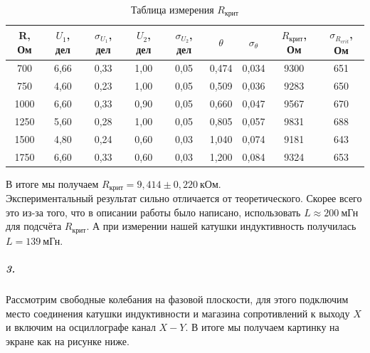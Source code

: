 \documentclass[a4paper,12pt]{article}
\begin{document}
\begin{table}[h!]
\begin{center}
\begin{tabular}{|c|c|c|c|c|c|c|c|c|}
\hline
R, Ом & $U_1$, дел & $\sigma_{U_1}$, дел & $U_2$, дел & $\sigma_{U_2}$, дел & $\theta$ & $\sigma_{\theta}$ & $R_{крит}$, Ом & $\sigma_{R_{crit}}$, Ом \\ \hline
700  & 6,66          & 0,33                 & 1,00        & 0,05                 & 0,474     & 0,034              & 9300          & 651                    \\ \hline
750  & 4,60          & 0,23                 & 1,00        & 0,05                 & 0,509     & 0,036              & 9283          & 650                    \\ \hline
1000  & 6,60          & 0,33                 & 0,90        & 0,05                 & 0,660     & 0,047              & 9567          & 670                    \\ \hline
1250  & 5,60          & 0,28                 & 1,00        & 0,05                 & 0,805      & 0,057               & 9831          & 688                    \\ \hline
1500  & 4,80          & 0,24                 & 0,60        & 0,03                 & 1,040      & 0,074               & 9181          & 643                    \\ \hline
1750  & 6,60          & 0,33                 & 0,60          & 0,03                 & 1,200      & 0,084               & 9324          & 653                    \\ \hline
\end{tabular}
\caption{Таблица измерения $R_{крит}$}
\end{center}
\end{table}
В итоге мы получаем $R_{крит}=9,414\pm 0,220~ \text{кОм}$.\\
Экспериментальный результат сильно отличается от теоретического. Скорее всего это из-за того, что в описании работы было написано, использовать $L\approx 200 ~\text{мГн}$ для подсчёта $R_{крит}$. А при измерении нашей катушки индуктивность получилась $L=139 ~\text{мГн}$. 
\subparagraph{3.}Рассмотрим свободные колебания на фазовой плоскости, для этого подключим место соединения катушки индуктивности и магазина сопротивлений к выходу $X$ и включим на осциллографе канал $X-Y$. В итоге мы получаем картинку на экране как на рисунке ниже.
\end{document}
